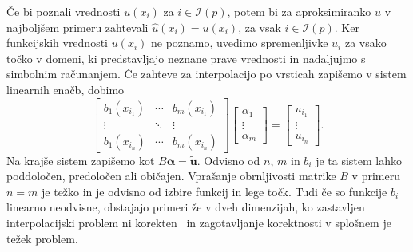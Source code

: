 \documentclass[12pt,a4paper,twoside]{article}
\theoremstyle{definition} %
\theoremstyle{plain} %
\numberwithin{equation}{section}
\newcommand{\I}{\mathcal{I}}
\renewcommand{\b}{\boldsymbol}
\newcommand{\uh}{\hat{u}}
\begin{document}
Če bi poznali vrednosti $u(x_i)$ za $i \in \I(p)$, potem bi za aproksimiranko
$\uh$ v najboljšem primeru zahtevali  $\hat{u}(x_i) = u(x_i)$, za vsak $i \in \I(p)$.
Ker funkcijskih vrednosti $u(x_i)$ ne poznamo, uvedimo spremenljivke $u_i$ za vsako točko v domeni,
ki predstavljajo neznane prave vrednosti in nadaljujmo s simbolnim računanjem.
Če zahteve za interpolacijo po vrsticah zapišemo v sistem linearnih enačb, dobimo
\begin{equation}
\begin{bmatrix}
  b_1(x_{i_1}) & \cdots & b_m(x_{i_1}) \\
  \vdots & \ddots & \vdots   \\
  b_1(x_{i_n}) & \cdots & b_m(x_{i_n})
\end{bmatrix}
\begin{bmatrix}
  \alpha_1 \\ \vdots \\ \alpha_m
\end{bmatrix}
=
\begin{bmatrix}
  u_{i_1} \\ \vdots \\ u_{i_n}
\end{bmatrix}.
  \label{eq:shape-system}
\end{equation}
Na krajše sistem zapišemo kot $B\b{\alpha} = \b{\tilde{u}}$. Odvisno od $n$, $m$ in $b_i$ je ta
sistem lahko poddoločen, predoločen ali običajen. Vprašanje obrnljivosti matrike $B$ v primeru $n=m$
je težko in je odvisno od izbire funkcij in lege točk. Tudi če so funkcije $b_i$ linearno neodvisne,
obstajajo primeri že v dveh dimenzijah, ko zastavljen interpolacijski problem ni
korekten~\cite[str.\ 79, izrek 2.2]{kozak2008numericna} in zagotavljanje korektnosti v splošnem je
težek problem.
\end{document}
